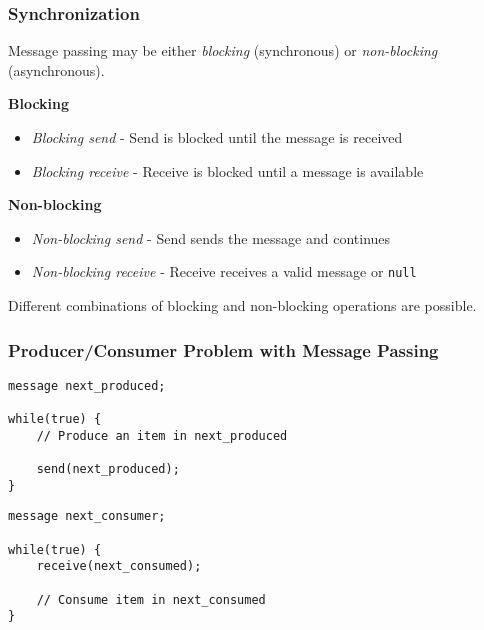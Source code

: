 \documentclass[]{article}
\begin{document}
\subsubsection*{Synchronization}

Message passing may be either \emph{blocking} (synchronous) or \emph{non-blocking} (asynchronous).

\textbf{Blocking}
\begin{itemize}
    \item \emph{Blocking send} - Send is blocked until the message is received
    \item \emph{Blocking receive} - Receive is blocked until a message is available
\end{itemize}

\textbf{Non-blocking}
\begin{itemize}
    \item \emph{Non-blocking send} - Send sends the message and continues
    \item \emph{Non-blocking receive} - Receive receives a valid message or \verb|null|
\end{itemize}

Different combinations of blocking and non-blocking operations are possible.

\subsubsection*{Producer/Consumer Problem with Message Passing}

\begin{tcolorbox}[title = Producer]
\begin{verbatim}
message next_produced;

while(true) {
    // Produce an item in next_produced

    send(next_produced);
}
\end{verbatim}
\end{tcolorbox}

\begin{tcolorbox}[title = Consumer]
\begin{verbatim}
message next_consumer;

while(true) {
    receive(next_consumed);

    // Consume item in next_consumed
}
\end{verbatim}
\end{tcolorbox}
\end{document}

